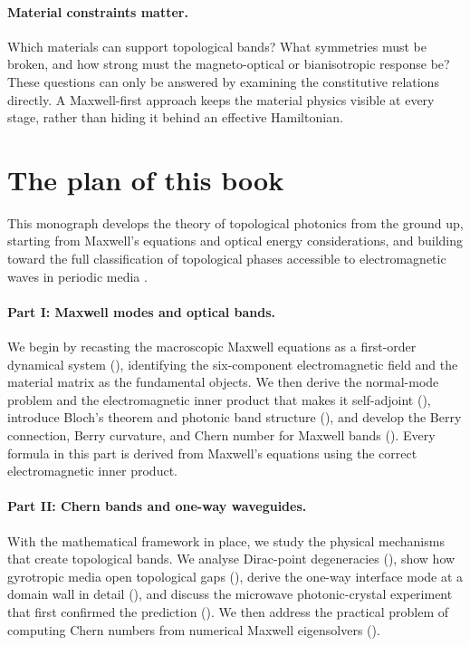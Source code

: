 \paragraph{Material constraints matter.}
Which materials can support topological bands?  What symmetries must be
broken, and how strong must the magneto-optical or bianisotropic
response be?  These questions can only be answered by examining the
constitutive relations directly.  A Maxwell-first approach keeps the
material physics visible at every stage, rather than hiding it behind
an effective Hamiltonian.

\section{The plan of this book}
\label{sec:ch1-plan}

This monograph develops the theory of topological photonics from the
ground up, starting from Maxwell's equations and optical energy
considerations, and building toward the full classification of
topological phases accessible to electromagnetic waves in periodic
media \cite{chen2021highlighting}.

\paragraph{Part I: Maxwell modes and optical bands.}
We begin by recasting the macroscopic Maxwell equations as a first-order
dynamical system (), identifying the
six-component electromagnetic field and the material matrix as the
fundamental objects.  We then derive the normal-mode problem and the
electromagnetic inner product that makes it self-adjoint
(), introduce Bloch's theorem and photonic
band structure (), and develop the Berry
connection, Berry curvature, and Chern number for Maxwell bands
().  Every formula in this part is derived from
Maxwell's equations using the correct electromagnetic inner product.

\paragraph{Part II: Chern bands and one-way waveguides.}
With the mathematical framework in place, we study the physical
mechanisms that create topological bands.  We analyse Dirac-point
degeneracies (), show how gyrotropic media open
topological gaps (), derive the one-way interface
mode at a domain wall in detail (), and
discuss the microwave photonic-crystal experiment that first confirmed
the prediction ().  We then address the
practical problem of computing Chern numbers from numerical Maxwell
eigensolvers ().

